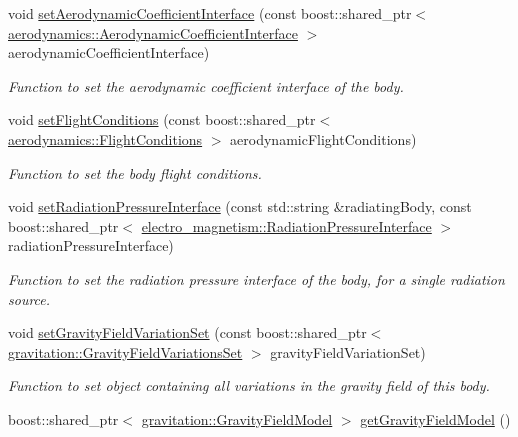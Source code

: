 \begin{DoxyCompactItemize}
void \hyperlink{classtudat_1_1simulation__setup_1_1Body_aced3d9fdcfc443e55c48e8869537fa5e}{set\+Aerodynamic\+Coefficient\+Interface} (const boost\+::shared\+\_\+ptr$<$ \hyperlink{classtudat_1_1aerodynamics_1_1AerodynamicCoefficientInterface}{aerodynamics\+::\+Aerodynamic\+Coefficient\+Interface} $>$ aerodynamic\+Coefficient\+Interface)
\begin{DoxyCompactList}\small\item\em Function to set the aerodynamic coefficient interface of the body. \end{DoxyCompactList}\item 
void \hyperlink{classtudat_1_1simulation__setup_1_1Body_a1d1ae13ce0f4ad3d74c69a3bfbddd654}{set\+Flight\+Conditions} (const boost\+::shared\+\_\+ptr$<$ \hyperlink{classtudat_1_1aerodynamics_1_1FlightConditions}{aerodynamics\+::\+Flight\+Conditions} $>$ aerodynamic\+Flight\+Conditions)
\begin{DoxyCompactList}\small\item\em Function to set the body flight conditions. \end{DoxyCompactList}\item 
void \hyperlink{classtudat_1_1simulation__setup_1_1Body_ad52f9dc125c95021748c42ee5dd03621}{set\+Radiation\+Pressure\+Interface} (const std\+::string \&radiating\+Body, const boost\+::shared\+\_\+ptr$<$ \hyperlink{classtudat_1_1electro__magnetism_1_1RadiationPressureInterface}{electro\+\_\+magnetism\+::\+Radiation\+Pressure\+Interface} $>$ radiation\+Pressure\+Interface)
\begin{DoxyCompactList}\small\item\em Function to set the radiation pressure interface of the body, for a single radiation source. \end{DoxyCompactList}\item 
void \hyperlink{classtudat_1_1simulation__setup_1_1Body_a72d039d757b7e8b70654b79c776a32d4}{set\+Gravity\+Field\+Variation\+Set} (const boost\+::shared\+\_\+ptr$<$ \hyperlink{classtudat_1_1gravitation_1_1GravityFieldVariationsSet}{gravitation\+::\+Gravity\+Field\+Variations\+Set} $>$ gravity\+Field\+Variation\+Set)
\begin{DoxyCompactList}\small\item\em Function to set object containing all variations in the gravity field of this body. \end{DoxyCompactList}\item 
boost\+::shared\+\_\+ptr$<$ \hyperlink{classtudat_1_1gravitation_1_1GravityFieldModel}{gravitation\+::\+Gravity\+Field\+Model} $>$ \hyperlink{classtudat_1_1simulation__setup_1_1Body_adddf3831784320b9bc7a4c2f18ddc57d}{get\+Gravity\+Field\+Model} ()

\end{DoxyCompactItemize}
